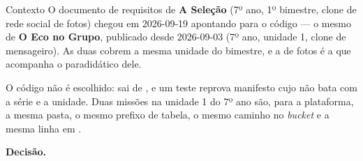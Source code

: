 \begin{especificacao}{Contexto}
O documento de requisitos de \textbf{A Seleção} (7º ano, 1º bimestre, clone de
rede social de fotos) chegou em 2026-09-19 apontando para o código
 --- o mesmo de \textbf{O Eco no Grupo}, publicado desde
2026-09-03 (7º ano, unidade 1, clone de mensageiro). As duas cobrem a mesma
unidade do bimestre, e a de fotos é a que acompanha o paradidático dele.

O código não é escolhido: sai de , e um teste
reprova manifesto cujo  não bata com a série e a unidade. Duas missões
na unidade 1 do 7º ano são, para a plataforma, a mesma pasta, o mesmo prefixo
de tabela, o mesmo caminho no \emph{bucket} e a mesma linha em
.
\end{especificacao}

\textbf{Decisão.}


